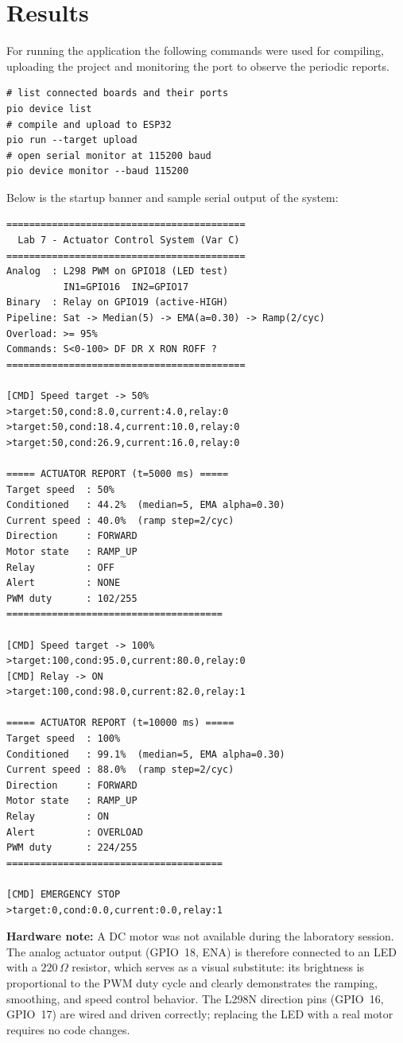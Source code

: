 \section{Results}

For running the application the following commands were used for compiling,
uploading the project and monitoring the port to observe the periodic reports.

\begin{verbatim}
# list connected boards and their ports
pio device list
# compile and upload to ESP32
pio run --target upload
# open serial monitor at 115200 baud
pio device monitor --baud 115200
\end{verbatim}

Below is the startup banner and sample serial output of the system:

\begin{verbatim}
==========================================
  Lab 7 - Actuator Control System (Var C)
==========================================
Analog  : L298 PWM on GPIO18 (LED test)
          IN1=GPIO16  IN2=GPIO17
Binary  : Relay on GPIO19 (active-HIGH)
Pipeline: Sat -> Median(5) -> EMA(a=0.30) -> Ramp(2/cyc)
Overload: >= 95%
Commands: S<0-100> DF DR X RON ROFF ?
==========================================

[CMD] Speed target -> 50%
>target:50,cond:8.0,current:4.0,relay:0
>target:50,cond:18.4,current:10.0,relay:0
>target:50,cond:26.9,current:16.0,relay:0

===== ACTUATOR REPORT (t=5000 ms) =====
Target speed  : 50%
Conditioned   : 44.2%  (median=5, EMA alpha=0.30)
Current speed : 40.0%  (ramp step=2/cyc)
Direction     : FORWARD
Motor state   : RAMP_UP
Relay         : OFF
Alert         : NONE
PWM duty      : 102/255
======================================

[CMD] Speed target -> 100%
>target:100,cond:95.0,current:80.0,relay:0
[CMD] Relay -> ON
>target:100,cond:98.0,current:82.0,relay:1

===== ACTUATOR REPORT (t=10000 ms) =====
Target speed  : 100%
Conditioned   : 99.1%  (median=5, EMA alpha=0.30)
Current speed : 88.0%  (ramp step=2/cyc)
Direction     : FORWARD
Motor state   : RAMP_UP
Relay         : ON
Alert         : OVERLOAD
PWM duty      : 224/255
======================================

[CMD] EMERGENCY STOP
>target:0,cond:0.0,current:0.0,relay:1
\end{verbatim}

\textbf{Hardware note:} A DC motor was not available during the laboratory session.
The analog actuator output (GPIO~18, ENA) is therefore connected to an LED with a
$220\,\Omega$ resistor, which serves as a visual substitute: its brightness is
proportional to the PWM duty cycle and clearly demonstrates the ramping, smoothing,
and speed control behavior. The L298N direction pins (GPIO~16, GPIO~17) are wired and
driven correctly; replacing the LED with a real motor requires no code changes.


